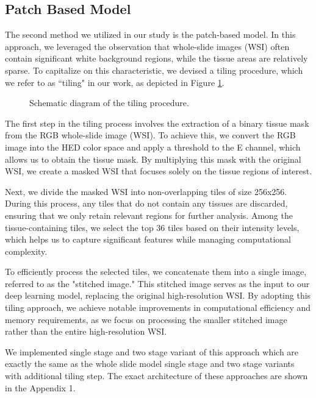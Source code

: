 \documentclass[conference]{IEEEtran}
\begin{document}
\subsection{Patch Based Model}
The second method we utilized in our study is the patch-based model. In this approach, we leveraged the observation that whole-slide images (WSI) often contain significant white background regions, while the tissue areas are relatively sparse. To capitalize on this characteristic, we devised a tiling procedure, which we refer to as ``tiling" in our work, as depicted in Figure \ref{fig:tiling}.

\begin{figure}[h!]
  \centering
    
  \caption{Schematic diagram of the tiling procedure.}
  \label{fig:tiling}
\end{figure}

The first step in the tiling process involves the extraction of a binary tissue mask from the RGB whole-slide image (WSI). To achieve this, we convert the RGB image into the HED color space and apply a threshold to the E channel, which allows us to obtain the tissue mask. By multiplying this mask with the original WSI, we create a masked WSI that focuses solely on the tissue regions of interest.

Next, we divide the masked WSI into non-overlapping tiles of size 256x256. During this process, any tiles that do not contain any tissues are discarded, ensuring that we only retain relevant regions for further analysis. Among the tissue-containing tiles, we select the top 36 tiles based on their intensity levels, which helps us to capture significant features while managing computational complexity.

To efficiently process the selected tiles, we concatenate them into a single image, referred to as the "stitched image." This stitched image serves as the input to our deep learning model, replacing the original high-resolution WSI. By adopting this tiling approach, we achieve notable improvements in computational efficiency and memory requirements, as we focus on processing the smaller stitched image rather than the entire high-resolution WSI. 

We implemented single stage and two stage variant of this approach which are exactly the same as the whole slide model single stage and two stage variants with additional tiling step. The exact architecture of these approaches are shown in the Appendix 1.
\end{document}
